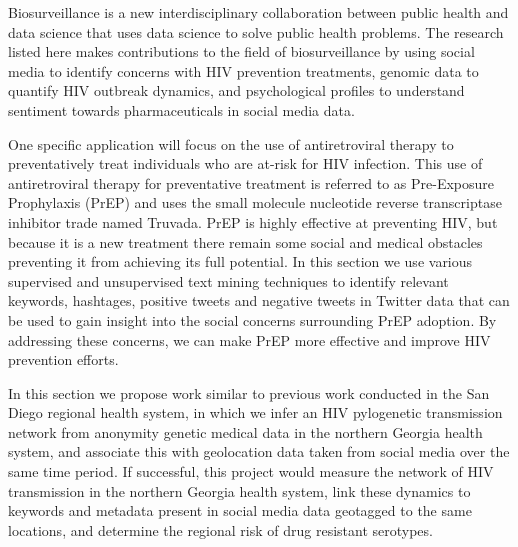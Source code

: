 


Biosurveillance is a new interdisciplinary collaboration between public health and data science that uses data science to solve public health problems. The research listed here makes contributions to the field of biosurveillance by using social media to identify concerns with HIV prevention treatments, genomic data to quantify HIV outbreak dynamics, and psychological profiles to understand sentiment towards pharmaceuticals in social media data.

One specific application will focus on the use of antiretroviral therapy to preventatively treat individuals who are at-risk for HIV infection. This use of antiretroviral therapy for preventative treatment is referred to as Pre-Exposure Prophylaxis (PrEP) and uses the small molecule nucleotide reverse transcriptase inhibitor trade named Truvada. PrEP is highly effective at preventing HIV, but because it is a new treatment there remain some social and medical obstacles preventing it from achieving its full potential. In this section we use various supervised and unsupervised text mining techniques to identify relevant keywords, hashtages, positive tweets and negative tweets in Twitter data that can be used to gain insight into the social concerns surrounding PrEP adoption. By addressing these concerns, we can make PrEP more effective and improve HIV prevention efforts.

In this section we propose work similar to previous work conducted in the San Diego regional health system, in which we infer an HIV pylogenetic transmission network from anonymity genetic medical data in the northern Georgia health system, and associate this with geolocation data taken from social media over the same time period. If successful, this project would measure the network of HIV transmission in the northern Georgia health system, link these dynamics to keywords and metadata present in social media data geotagged to the same locations, and determine the regional risk of drug resistant serotypes.


